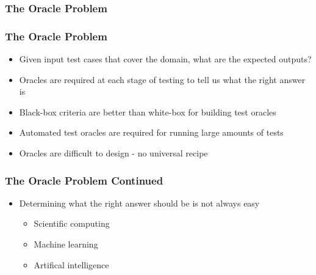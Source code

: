 \documentclass[t,12pt,numbers,fleqn]{beamer}
\begin{document}

\begin{frame}
\frametitle{The Oracle Problem}


\end{frame}


\begin{frame}
\frametitle{The Oracle Problem}

\begin{itemize}

\item Given input test cases that cover the domain, what are the expected
  outputs?
\item Oracles are required at each stage of testing to tell us what the right
  answer is
\item Black-box criteria are better than white-box for building test oracles
\item Automated test oracles are required for running large amounts of tests
\item Oracles are difficult to design - no universal recipe
\end{itemize}

\end{frame}


\begin{frame}
\frametitle{The Oracle Problem Continued}

\begin{itemize}

\item Determining what the right answer should be is not always easy
\begin{itemize}
\item Scientific computing
\item Machine learning
\item Artifical intelligence
\end{itemize}
\end{itemize}

\end{frame}

\end{document}

